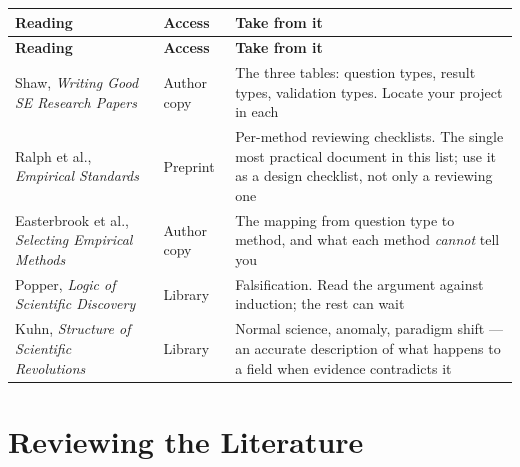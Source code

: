 \begin{center}
\small
\begin{longtable}{@{}L{4.4cm}L{1.8cm}L{7.6cm}@{}}
\toprule
\textbf{Reading} & \textbf{Access} & \textbf{Take from it} \\
\midrule
\endfirsthead
\toprule
\textbf{Reading} & \textbf{Access} & \textbf{Take from it} \\
\midrule
\endhead
\bottomrule
\endfoot
Shaw, \emph{Writing Good SE Research Papers}~\cite{shaw2003writing}
  & Author copy
  & The three tables: question types, result types, validation types. Locate
    your project in each \\
Ralph et al., \emph{Empirical Standards}~\cite{ralph2021empirical}
  & \oa{} Preprint
  & Per-method reviewing checklists. The single most practical document in this
    list; use it as a design checklist, not only a reviewing one \\
Easterbrook et al., \emph{Selecting Empirical Methods}~\cite{easterbrook2008selecting}
  & Author copy
  & The mapping from question type to method, and what each method
    \emph{cannot} tell you \\
Popper, \emph{Logic of Scientific Discovery}~\cite{popper2002logic}
  & Library
  & Falsification. Read the argument against induction; the rest can wait \\
Kuhn, \emph{Structure of Scientific Revolutions}~\cite{kuhn1962structure}
  & Library
  & Normal science, anomaly, paradigm shift --- an accurate description of what
    happens to a field when evidence contradicts it \\
\end{longtable}
\end{center}

\section{Reviewing the Literature}

